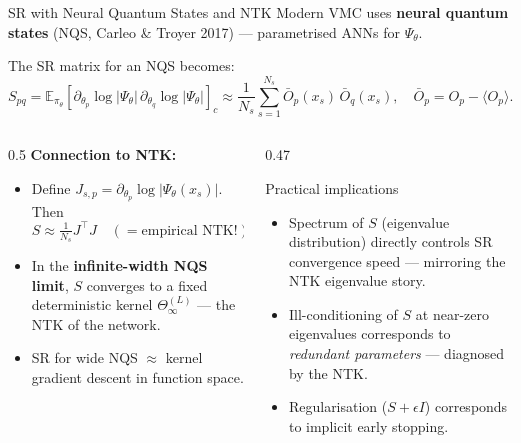 \documentclass[aspectratio=169, 10pt]{beamer}
\newcommand{\E}{\mathbb{E}}
\newcommand{\highlight}[1]{\textcolor{blue!70!black}{\textbf{#1}}}
\begin{document}
\begin{frame}{SR with Neural Quantum States and NTK}
  Modern VMC uses \textbf{neural quantum states} (NQS, Carleo \& Troyer 2017) — parametrised ANNs for $\Psi_\theta$.

  \vspace{0.3em}
  The SR matrix for an NQS becomes:
  \[
    S_{pq} = \E_{\pi_\theta}\!\left[\partial_{\theta_p}\log|\Psi_\theta|\,\partial_{\theta_q}\log|\Psi_\theta|\right]_c
    \approx \frac{1}{N_s}\sum_{s=1}^{N_s} \bar O_p(x_s)\,\bar O_q(x_s), \quad \bar O_p = O_p - \langle O_p\rangle.
  \]

  \begin{columns}[T]
    \begin{column}{0.5\textwidth}
      \textbf{Connection to NTK:}
      \begin{itemize}
        \item Define $J_{s,p} = \partial_{\theta_p}\log|\Psi_\theta(x_s)|$. Then
          \[S \approx \tfrac{1}{N_s}J^\top J \quad (= \text{empirical NTK!})\]
        \item In the \highlight{infinite-width NQS limit}, $S$ converges to a fixed deterministic kernel $\Theta^{(L)}_\infty$ — the NTK of the network.
        \item SR for wide NQS $\approx$ kernel gradient descent in function space.
      \end{itemize}
    \end{column}
    \begin{column}{0.47\textwidth}
      \begin{alertblock}{Practical implications}
        \begin{itemize}
          \item Spectrum of $S$ (eigenvalue distribution) directly controls SR convergence speed — mirroring the NTK eigenvalue story.
          \item Ill-conditioning of $S$ at near-zero eigenvalues corresponds to \emph{redundant parameters} — diagnosed by the NTK.
          \item Regularisation ($S + \epsilon I$) corresponds to implicit early stopping.
        \end{itemize}
      \end{alertblock}
    \end{column}
  \end{columns}
\end{frame}
\end{document}
